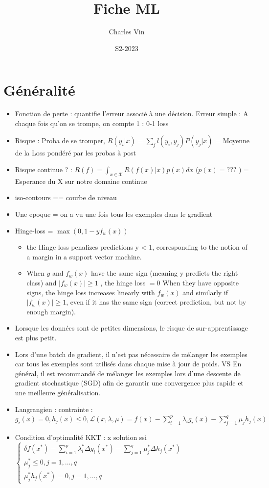 \documentclass{article}
\title{Fiche ML}
\author{Charles Vin}
\date{S2-2023}
\theoremstyle{plain}%
\theoremstyle{definition}
\theoremstyle{remark}
\begin{document}
\maketitle
\section{Généralité}
\begin{itemize}
    \item Fonction de perte : quantifie l'erreur associé à une décision. Erreur simple : A chaque fois qu'on se trompe, on compte 1 : 0-1 loss
    \item Risque : Proba de se tromper, $ R(y_i | x) = \sum_{j}^{} l(y_i, y_j)P(y_j | x)$ = Moyenne de la Loss pondéré par les probas à post
    \item Risque continue ? : $ R(f) = \int_{x \in \mathcal{X}}^{}R(f(x)|x)p(x) dx  $ ($ p(x) = ??? $ ) = Esperance du X sur notre domaine continue
    \item iso-contours == courbe de niveau
    \item Une epoque = on a vu une fois tous les exemples dans le gradient
    \item Hinge-loss = $ \max (0, 1 - y f_w(x)) $ \begin{itemize}
        \item the Hinge loss penalizes predictions y < 1, corresponding to the notion of a margin in a support vector machine.
        \item When $ y $ and $ f_w(x) $ have the same sign (meaning y predicts the right class) and $ \left| f_w(x) \right| \geq 1 $ , the hinge loss $ = 0 $  When they have opposite signs, the hinge loss increases linearly with $ f_w(x) $  and similarly if $ \left| f_w(x) \right| \geq 1 $, even if it has the same sign (correct prediction, but not by enough margin).
    \end{itemize}
    \item Lorsque les données sont de petites dimensions, le risque de sur-apprentissage est plus petit.
    \item Lors d'une batch de gradient, il n'est pas nécessaire de mélanger les exemples car tous les exemples sont utilisés dans chaque mise à jour de poids. VS En général, il est recommandé de mélanger les exemples lors d'une descente de gradient stochastique (SGD) afin de garantir une convergence plus rapide et une meilleure généralisation.
    \item Langrangien : contrainte : $ \displaystyle g_i(x) = 0, h_j(x) \leq 0, \mathcal{L}(x, \lambda , \mu ) = f(x) - \sum_{i=1}^{p} \lambda _i g_i(x) - \sum_{j=1}^{q} \mu _j h_j(x)$
    \item Condition d'optimalité KKT : x solution ssi $ \displaystyle \begin{cases}
        \delta f(x^*) - \sum_{i=1}^{p} \lambda _i^* \Delta g_i(x^*) - \sum_{j=1}^{q} \mu _j^* \Delta  h_j(x^*)\\
        \mu _j ^* \leq 0, j = 1, \dots, q \\
        \mu _j^* h_j(x^*) = 0, j = 1, \dots, q
    \end{cases}  $ 
\end{itemize}
\end{document}
